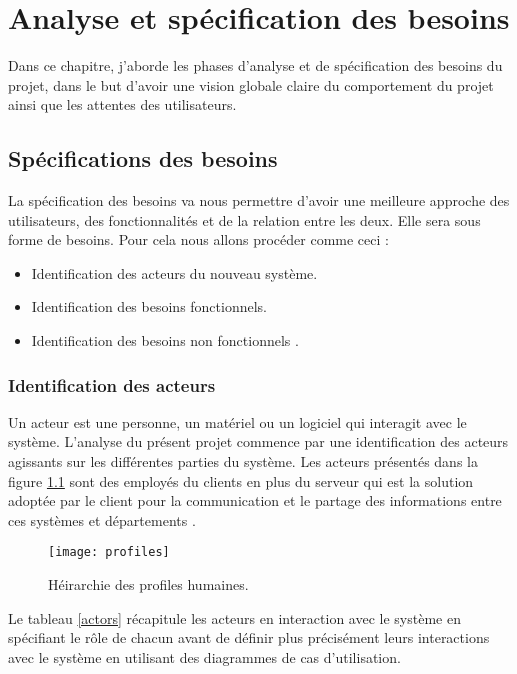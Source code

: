 \chapter{Analyse et spécification des besoins}
\label{sec:unchapitre}

\begin{fquote}Dans ce chapitre, j’aborde les phases d’analyse et de spécification des besoins du projet, dans le but d’avoir une vision globale claire du comportement du projet ainsi que les attentes des utilisateurs.
 \end{fquote}

\clearpage

\section{Spécifications des besoins}

La spécification des besoins va nous permettre d’avoir une meilleure approche des utilisateurs, des fonctionnalités et de la relation entre les deux. Elle sera sous forme de besoins. Pour cela nous allons procéder comme ceci :
\begin{itemize}
	\item Identification des acteurs du nouveau système.
	\item Identification des besoins fonctionnels.
	\item Identification des besoins non fonctionnels .
\end{itemize}




\subsection{Identification des acteurs}
Un acteur est une personne, un matériel ou un logiciel qui interagit avec le système. L’analyse du présent projet commence par une identification des acteurs agissants sur les différentes parties du système. Les acteurs présentés dans la figure \ref{fig:profiles} sont des employés du clients en plus du serveur  qui est la solution adoptée par le client pour la communication et le partage des informations entre ces systèmes et départements .

\begin{figure}[ht]
  \centering
  \texttt{[image: profiles]}
  \caption{Héirarchie des profiles humaines.}
  \label{fig:profiles}
\end{figure}
\FloatBarrier
Le tableau \ref{actors} récapitule les acteurs en interaction avec le système en spécifiant le rôle de chacun avant de définir plus précisément leurs interactions avec le système en utilisant des diagrammes de cas d'utilisation.\\

